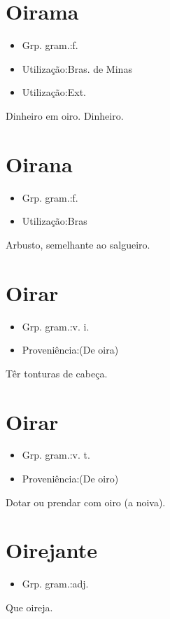 \section{Oirama}
\begin{itemize}
\item {Grp. gram.:f.}
\end{itemize}
\begin{itemize}
\item {Utilização:Bras. de Minas}
\end{itemize}
\begin{itemize}
\item {Utilização:Ext.}
\end{itemize}
Dinheiro em oiro.
Dinheiro.
\section{Oirana}
\begin{itemize}
\item {Grp. gram.:f.}
\end{itemize}
\begin{itemize}
\item {Utilização:Bras}
\end{itemize}
Arbusto, semelhante ao salgueiro.
\section{Oirar}
\begin{itemize}
\item {Grp. gram.:v. i.}
\end{itemize}
\begin{itemize}
\item {Proveniência:(De \textunderscore oira\textunderscore )}
\end{itemize}
Têr tonturas de cabeça.
\section{Oirar}
\begin{itemize}
\item {Grp. gram.:v. t.}
\end{itemize}
\begin{itemize}
\item {Proveniência:(De \textunderscore oiro\textunderscore )}
\end{itemize}
Dotar ou prendar com oiro (a noiva).
\section{Oirejante}
\begin{itemize}
\item {Grp. gram.:adj.}
\end{itemize}
Que oireja.
